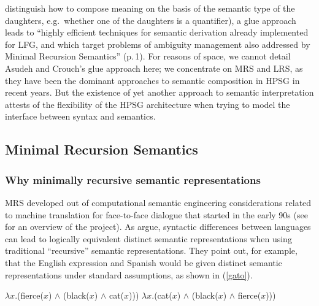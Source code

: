\documentclass[output=paper
	        ,collection
	        ,collectionchapter
 	        ,biblatex
                ,babelshorthands
                ,newtxmath
                ,draftmode
                ,colorlinks, citecolor=brown
]{langscibook}
\begin{document}
 distinguish how to compose meaning on the basis of the semantic type of the daughters, e.g.\ whether one of the daughters is a quantifier), a glue approach leads to ``highly efficient techniques for semantic derivation already implemented for LFG, and which target problems of ambiguity management also addressed by Minimal Recursion Semantics'' (p.\,1). For reasons of space, we cannot detail Asudeh and Crouch's glue approach here; we concentrate on MRS and LRS, as they have been the dominant approaches to semantic composition in HPSG in recent years. But the existence of yet another approach to semantic interpretation attests of the flexibility of the HPSG architecture when trying to model the interface between syntax and semantics.


\subsection{Minimal Recursion Semantics}
\label{sec-minimal-recursion-semantics}

\subsubsection{Why minimally recursive semantic representations}

MRS developed out of computational semantic engineering considerations related to machine translation for face-to-face dialogue that started in the early 90s (see \citealt{Kayetal1992} for an overview of the \verbmobil project). As \citet{Copestakeetal1995} argue, syntactic differences between languages can lead to logically equivalent distinct semantic representations when using traditional ``recursive'' semantic representations. They point out, for example, that the English expression  and Spanish  would be given distinct semantic representations under standard assumptions, as shown in (\ref{gato}).

\begin{exe}
\ex\label{gato}
\begin{xlist}
\ex\label{gatoa}
$\lambda x$.(fierce($x$) $\wedge$ (black($x$) $\wedge$ cat($x$)))
\ex\label{gatob}
$\lambda x$.(cat($x$) $\wedge$ (black($x$) $\wedge$ fierce($x$)))
\end{xlist}
\end{exe}
\end{document}
